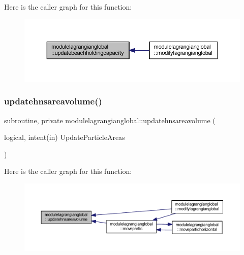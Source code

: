 Here is the caller graph for this function\+:\nopagebreak
\begin{figure}[H]
\begin{center}
\leavevmode
\includegraphics[width=350pt]{namespacemodulelagrangianglobal_a339c78433f179a296304ed03a3fcfae9_icgraph}
\end{center}
\end{figure}
\mbox{\label{namespacemodulelagrangianglobal_a4efc172cbdf3206e44a5ff0f788c26e1}} 
\subsubsection{\texorpdfstring{updatehnsareavolume()}{updatehnsareavolume()}}
{\footnotesize\ttfamily subroutine, private modulelagrangianglobal\+::updatehnsareavolume (\begin{DoxyParamCaption}\item[{logical, intent(in)}]{Update\+Particle\+Areas }\end{DoxyParamCaption})\hspace{0.3cm}{\ttfamily [private]}}

Here is the caller graph for this function\+:\nopagebreak
\begin{figure}[H]
\begin{center}
\leavevmode
\includegraphics[width=350pt]{namespacemodulelagrangianglobal_a4efc172cbdf3206e44a5ff0f788c26e1_icgraph}
\end{center}
\end{figure}
\mbox{\label{namespacemodulelagrangianglobal_a48c7d753da87150903bd31cb8ff38fb6}} 
